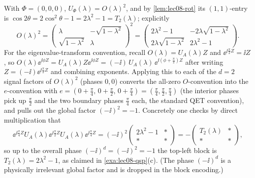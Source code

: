 \begin{solution}
With $\Phi=(0,0,0)$, $U_\Phi(\lambda)=O(\lambda)^2$, and by \cref{lem:lec08-rot} its
$(1,1)$-entry is $\cos2\theta=2\cos^2\theta-1=2\lambda^2-1=T_2(\lambda)$; explicitly
\[
  O(\lambda)^2=\begin{pmatrix}\lambda&-\sqrt{1-\lambda^2}\\ \sqrt{1-\lambda^2}&\lambda\end{pmatrix}^2
  =\begin{pmatrix}2\lambda^2-1&-2\lambda\sqrt{1-\lambda^2}\\ 2\lambda\sqrt{1-\lambda^2}&2\lambda^2-1\end{pmatrix}.
\]
For the eigenvalue-transform convention, recall $O(\lambda)=U_A(\lambda)Z$ and
$\ee^{\ii\frac\pi2 Z}=\ii Z$, so $O(\lambda)\ee^{\ii\phi Z}=U_A(\lambda)Z\ee^{\ii\phi Z}
=(-\ii)\,U_A(\lambda)\,\ee^{\ii(\phi+\frac\pi2)Z}$ after writing
$Z=(-\ii)\ee^{\ii\frac\pi2 Z}$ and combining exponents. Applying this to each of the
$d=2$ signal factors of $O(\lambda)^2$ (phases $0,0$) converts the all-zero
$O$-convention into the $e$-convention with
$e=(0+\tfrac\pi4,\,0+\tfrac\pi2,\,0+\tfrac\pi4)=(\tfrac\pi4,\tfrac\pi2,\tfrac\pi4)$
(the interior phases pick up $\tfrac\pi2$ and the two boundary phases $\tfrac\pi4$
each, the standard QET convention), and pulls out the global factor $(-\ii)^2=-1$. Concretely one checks by
direct multiplication that
\[
  \ee^{\ii\frac\pi4 Z}U_A(\lambda)\ee^{\ii\frac\pi2 Z}U_A(\lambda)\ee^{\ii\frac\pi4 Z}
  =(-\ii)^2\begin{pmatrix}2\lambda^2-1&*\\ *&*\end{pmatrix}
  =-\begin{pmatrix}T_2(\lambda)&*\\ *&*\end{pmatrix},
\]
so up to the overall phase $(-\ii)^d=(-\ii)^2=-1$ the top-left block is
$T_2(\lambda)=2\lambda^2-1$, as claimed in \cref{exa:lec08-qsp}(c). (The phase
$(-\ii)^d$ is a physically irrelevant global factor and is dropped in the block
encoding.)
\end{solution}
